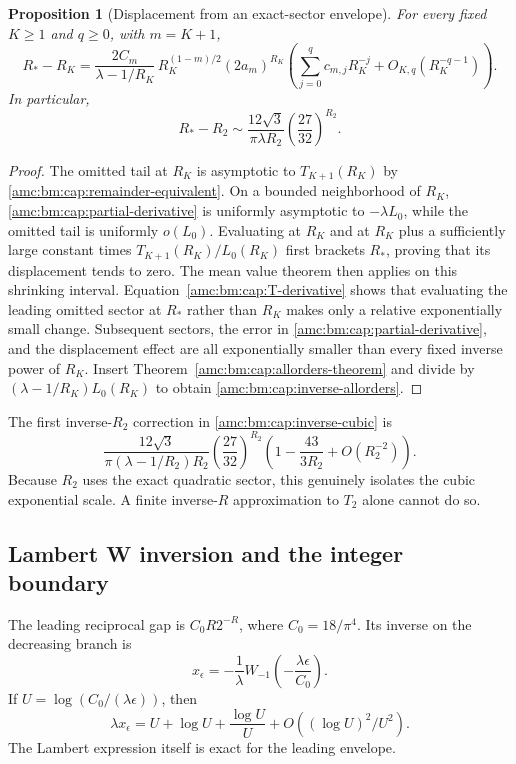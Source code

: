 \documentclass[11pt,letterpaper]{article}
\newtheorem{proposition}[theorem]{Proposition}
\theoremstyle{remark}\newtheorem{remark}[theorem]{Remark}
\begin{document}
\begin{proposition}[Displacement from an exact-sector envelope]\label{amc:bm:cap:inverse-envelope}
For every fixed $K\ge1$ and $q\ge0$, with $m=K+1$,
\begin{equation}\label{amc:bm:cap:inverse-allorders}
 R_*-R_K=
 \frac{2C_m}{\lambda-1/R_K}\,
 R_K^{(1-m)/2}(2a_m)^{R_K}
 \left(\sum_{j=0}^qc_{m,j}R_K^{-j}+O_{K,q}(R_K^{-q-1})\right).
\end{equation}
In particular,
\begin{equation}\label{amc:bm:cap:inverse-cubic}
 R_*-R_2\sim\frac{12\sqrt3}{\pi\lambda R_2}
 \left(\frac{27}{32}\right)^{R_2}.
\end{equation}
\end{proposition}
\begin{proof}
The omitted tail at $R_K$ is asymptotic to $T_{K+1}(R_K)$ by \eqref{amc:bm:cap:remainder-equivalent}. On a bounded neighborhood of $R_K$, \eqref{amc:bm:cap:partial-derivative} is uniformly asymptotic to $-\lambda L_0$, while the omitted tail is uniformly $o(L_0)$. Evaluating at $R_K$ and at $R_K$ plus a sufficiently large constant times $T_{K+1}(R_K)/L_0(R_K)$ first brackets $R_*$, proving that its displacement tends to zero. The mean value theorem then applies on this shrinking interval. Equation~\eqref{amc:bm:cap:T-derivative} shows that evaluating the leading omitted sector at $R_*$ rather than $R_K$ makes only a relative exponentially small change. Subsequent sectors, the error in \eqref{amc:bm:cap:partial-derivative}, and the displacement effect are all exponentially smaller than every fixed inverse power of $R_K$. Insert Theorem~\ref{amc:bm:cap:allorders-theorem} and divide by $(\lambda-1/R_K)L_0(R_K)$ to obtain \eqref{amc:bm:cap:inverse-allorders}.
\end{proof}
The first inverse-$R_2$ correction in \eqref{amc:bm:cap:inverse-cubic} is
\[
 \frac{12\sqrt3}{\pi(\lambda-1/R_2)R_2}
 \left(\frac{27}{32}\right)^{R_2}
 \left(1-\frac{43}{3R_2}+O(R_2^{-2})\right).
\]
Because $R_2$ uses the exact quadratic sector, this genuinely isolates the cubic exponential scale. A finite inverse-$R$ approximation to $T_2$ alone cannot do so.

\subsection{Lambert W inversion and the integer boundary}
The leading reciprocal gap is $C_0R2^{-R}$, where $C_0=18/\pi^4$. Its inverse on the decreasing branch is
\begin{equation}\label{amc:bm:cap:W-root}
 x_\epsilon=-\frac1\lambda
 W_{-1}\!\left(-\frac{\lambda\epsilon}{C_0}\right).
\end{equation}
If $U=\log(C_0/(\lambda\epsilon))$, then
\[
 \lambda x_\epsilon=U+\log U+\frac{\log U}{U}
 +O((\log U)^2/U^2).
\]
The Lambert expression itself is exact for the leading envelope.
\end{document}
